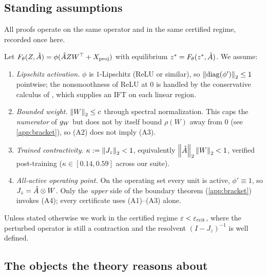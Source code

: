 \subsection{Standing assumptions}
\label{app:assumptions}

All proofs operate on the same operator and in the same certified regime, recorded once here.

\begin{definition}
\label{ass:tight-v2}
Let $F_\theta(Z,\hat{A})=\phi(\hat{A} Z W^\top + X_{\mathrm{proj}})$ with equilibrium
$z^{*}=F_\theta(z^{*},\hat{A})$. We assume:
\begin{enumerate}
\item[(A1)] \emph{Lipschitz activation.} $\phi$ is $1$-Lipschitz (ReLU or similar), so
$\left\|\operatorname{diag}(\phi')\right\|_2\le1$ pointwise; the nonsmoothness of ReLU at $0$ is handled by the conservative
calculus of \citet{bolte2021conservative}, which supplies an IFT on each linear region.
\item[(A2)] \emph{Bounded weight.} $\left\|W\right\|_2\le c$ through spectral normalization. This caps the
\emph{numerator} of $g_W$ but does not by itself bound $\rho(W)$ away from $0$ (see
\cref{app:bracket}), so (A2) does not imply (A3).
\item[(A3)] \emph{Trained contractivity.} $\kappa:=\left\|J_z\right\|_2<1$, equivalently
$\left\|\hat{A}\right\|_2\left\|W\right\|_2<1$, verified post-training ($\kappa\in[0.14,0.59]$ across our suite).
\item[(A4)] \emph{All-active operating point.} On the operating set every unit is active,
$\phi'\equiv1$, so $J_z=\hat{A}\otimes W$. Only the \emph{upper} side of the boundary theorem
(\cref{app:bracket}) invokes (A4); every certificate uses (A1)--(A3) alone.
\end{enumerate}
Unless stated otherwise we work in the certified regime $\varepsilon<\varepsilon_{\mathrm{crit}}$, where the perturbed
operator is still a contraction and the resolvent $(I-J_z)^{-1}$ is well defined.
\end{definition}

\subsection{The objects the theory reasons about}
\label{app:objects}

